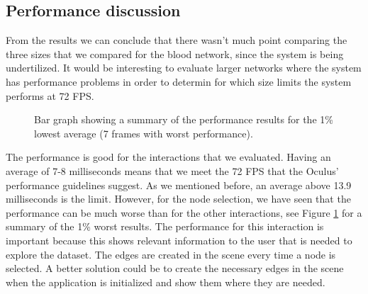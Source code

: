 \subsection{Performance discussion}
From the results we can conclude that there wasn't much point comparing the three sizes that we compared for the blood network, since the system is being undertilized. It would be interesting to evaluate larger networks where the system has performance problems in order to determin for which size limits the system performs at 72 FPS.

\begin{figure}[h!]
\centering
{}
\caption{Bar graph showing a summary of the performance results for the 1\% lowest average (7 frames with worst performance).}
\label{fig:performance_bar}
\end{figure}

The performance is good for the interactions that we evaluated. Having an average of 7-8 milliseconds means that we meet the 72 FPS that the Oculus' performance guidelines suggest. As we mentioned before, an average above 13.9 milliseconds is the limit. However, for the node selection, we have seen that the performance can be much worse than for the other interactions, see Figure \ref{fig:performance_bar} for a summary of the 1\% worst results. The performance for this interaction is important because this shows relevant information to the user that is needed to explore the dataset. The edges are created in the scene every time a node is selected. A better solution could be to create the necessary edges in the scene when the application is initialized and show them where they are needed.

